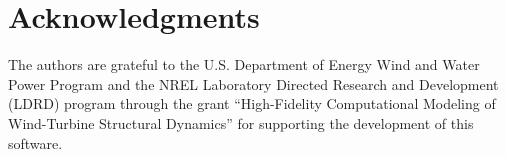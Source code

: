 \chapter*{Acknowledgments}
The authors are grateful to the U.S. Department of Energy Wind and Water Power Program  and the NREL Laboratory Directed Research and Development (LDRD) program through the grant ``High-Fidelity Computational Modeling of Wind-Turbine Structural Dynamics''
for supporting the development of this software.
